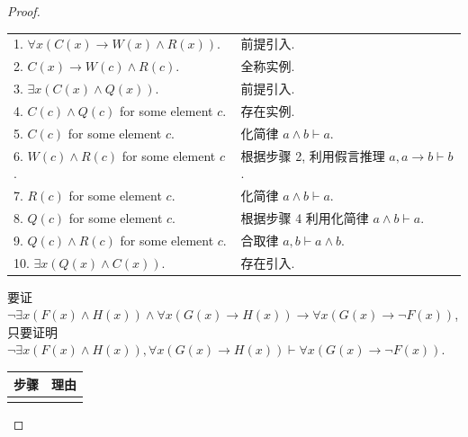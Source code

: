\documentclass[10pt,UTF8]{book} %
\begin{document}
\begin{example}
\begin{proof}
\begin{enumerate}[label={$\left.\arabic*\right)$}, itemsep=0pt]
{\begin{longtable}{p{}p{}}
            1. $\forall x \left(
                C(x) \to W(x) \wedge R(x)
            \right)$. & 前提引入. \\ 
            2. $C(x) \to W(c) \wedge R(c)$. & 全称实例. \\ 
            3. $\exists x \left(
                C(x) \wedge Q(x)
            \right)$. & 前提引入. \\
            4. $C(c) \wedge Q(c)$ for some element $c$. & 存在实例. \\ 
            5. $C(c)$ for some element $c$. & 化简律 $a \wedge b \vdash a$. \\ 
            6. $W(c) \wedge R(c)$ for some element $c$. & 根据步骤 2, 利用假言推理 $a, a\to b \vdash b$. \\ 
            7. $R(c)$ for some element $c$. & 化简律 $a \wedge b \vdash a$. \\ 
            8. $Q(c)$ for some element $c$. & 根据步骤 4 利用化简律  $a \wedge b \vdash a$. \\ 
            9. $Q(c) \wedge R(c)$ for some element $c$. & 合取律 $a, b \vdash a \wedge b$. \\ 
            10. $\exists x \left(
                Q(x) \wedge C(x)
            \right)$. & 存在引入. \\
            \end{longtable}
            \item 要证 $\lnot \exists x \left(
                F(x) \wedge H(x)
            \right) \wedge \forall x \left(
                G(x) \to H(x)
            \right) \to \forall x \left(
                G(x) \to \lnot F(x)
            \right)$,
            \newline 只要证明 $\lnot \exists x \left(
                F(x) \wedge H(x)
            \right), \forall x \left(
                G(x) \to H(x)
            \right) \vdash \forall x \left(
                G(x) \to \lnot F(x)
            \right)$.

            \begin{longtable}{p{}p{}}
            \toprule
            \textbf{步骤} & \textbf{理由} \\
            \midrule
            \endhead
            \bottomrule
            \endfoot
            

\end{longtable}}
\end{enumerate}
\end{proof}
\end{example}
\end{document}
